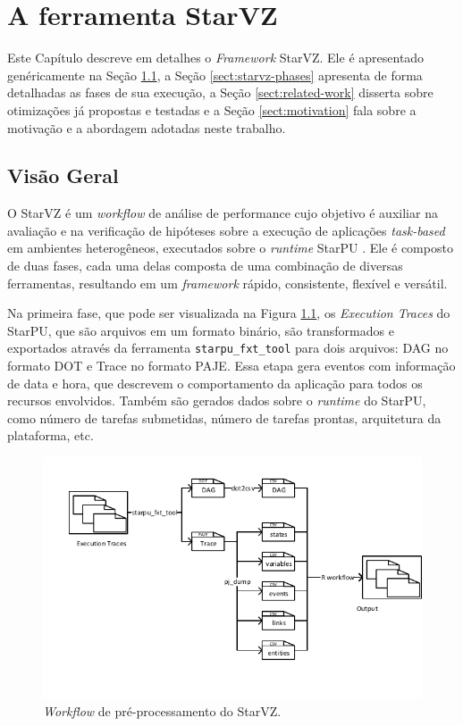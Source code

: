\chapter{A ferramenta StarVZ} \label{ch:starvz}

Este Capítulo descreve em detalhes o \emph{Framework} StarVZ. Ele é 
apresentado genéricamente na Seção \ref{sect:starvz-overview}, a Seção 
\ref{sect:starvz-phases} apresenta de forma detalhadas as fases de sua 
execução, a Seção \ref{sect:related-work} disserta sobre otimizações já 
propostas e testadas e a Seção \ref{sect:motivation} fala sobre a motivação e a 
abordagem adotadas neste trabalho.

\section{Visão Geral}\label{sect:starvz-overview}
O StarVZ \cite{ref:starvz} é um \emph{workflow} de análise de performance cujo 
objetivo é auxiliar na avaliação e na verificação de hipóteses sobre a execução 
de 
aplicações \emph{task-based} em ambientes heterogêneos, executados sobre o
\emph{runtime} StarPU \cite{ref:starpu}. Ele é composto de duas fases, cada uma 
delas composta de uma combinação de diversas ferramentas, resultando em um 
\emph{framework}
rápido, consistente, flexível e versátil.

Na primeira fase, que pode ser visualizada na Figura 
\ref{fig:starvz-workflow1}, 
os 
\emph{Execution Traces} do StarPU, que são arquivos em um formato binário, são 
transformados
e exportados através da ferramenta \texttt{starpu\_fxt\_tool} para dois 
arquivos: DAG no formato DOT 
e Trace no formato PAJE. Essa etapa gera eventos com informação de data e hora, 
que 
descrevem o comportamento da aplicação para todos os recursos envolvidos. 
Também 
são gerados 
dados sobre o \emph{runtime} do StarPU, como número de tarefas submetidas,
número de tarefas prontas, arquitetura da plataforma, etc.

\begin{figure}[ht]
 \centerline{\includegraphics[width=1\textwidth]{./img/step1-final.pdf}}
 \caption{\emph{Workflow} de pré-processamento do StarVZ.}
 \label{fig:starvz-workflow1}
\end{figure}

